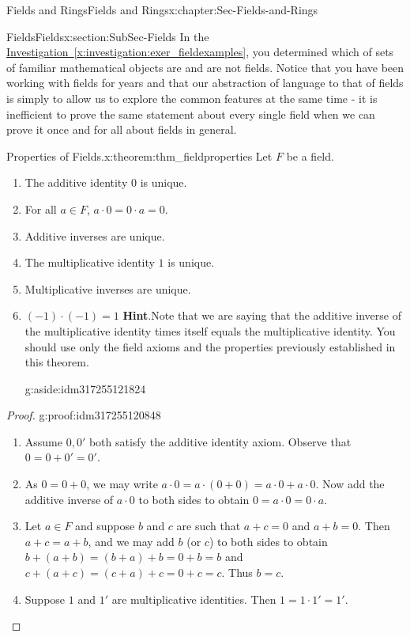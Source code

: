 \documentclass[oneside,10pt,]{book}
\newcommand{\blocktitlefont}{\relax}
\newcommand{\xreffont}{\relax}
\numberwithin{equation}{section}
\begin{document}
\begin{chapterptx}{Fields and Rings}{}{Fields and Rings}{}{}{x:chapter:Sec-Fields-and-Rings}
\begin{sectionptx}{Fields}{}{Fields}{}{}{x:section:SubSec-Fields}
In the \hyperref[x:investigation:exer_fieldexamples]{Investigation~{\xreffont\ref{x:investigation:exer_fieldexamples}}}, you determined which of sets of familiar mathematical objects are and are not fields. Notice that you have been working with fields for years and that our abstraction of language to that of fields is simply to allow us to explore the common features at the same time - it is inefficient to prove the same statement about every single field when we can prove it once and for all about fields in general.%
\begin{theorem}{Properties of Fields.}{}{x:theorem:thm_fieldproperties}%
Let \(F\) be a field.%
\begin{enumerate}
\item{}The additive identity \(0\) is unique.%
\item{}For all \(a\in F\), \(a \cdot 0 = 0\cdot a = 0\).%
\item{}Additive inverses are unique.%
\item{}The multiplicative identity \(1\) is unique.%
\item{}Multiplicative inverses are unique.%
\item{}\((-1)\cdot (-1) = 1\) \textbf{\blocktitlefont Hint}.\quad{}Note that we are saying that the additive inverse of the multiplicative identity times itself equals the multiplicative identity. You should use only the field axioms and the properties previously established in this theorem.%
\begin{aside}{}{g:aside:idm317255121824}%
\end{aside}
%
\end{enumerate}
%
\end{theorem}
\begin{proof}{}{g:proof:idm317255120848}
%
\begin{enumerate}
\item{}Assume \(0, 0'\) both satisfy the additive identity axiom. Observe that \(0 = 0 + 0' = 0'\).%
\item{}As \(0 = 0 + 0\), we may write \(a\cdot 0 = a\cdot (0 + 0) = a\cdot 0 + a \cdot 0\). Now add the additive inverse of \(a\cdot 0\) to both sides to obtain \(0 = a \cdot 0 = 0\cdot a\).%
\item{}Let \(a\in F\) and suppose \(b\) and \(c\) are such that \(a+c = 0\) and \(a+b = 0\). Then \(a+c = a+b\), and we may add \(b\) (or \(c\)) to both sides to obtain \(b+(a+b) = (b+a)+b = 0 + b = b\) and \(c+(a+c) = (c+a)+c = 0 + c = c\). Thus \(b=c\).%
\item{}Suppose \(1\) and \(1'\) are multiplicative identities. Then \(1 = 1 \cdot 1' = 1'\).%

\end{enumerate}
\end{proof}
\end{sectionptx}
\end{chapterptx}
\end{document}
